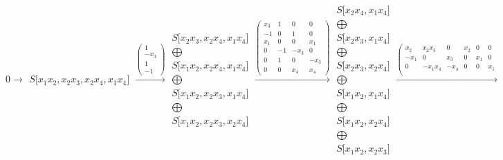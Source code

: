 \documentclass[12pt,a3paper,landscape]{amsart}
\numberwithin{equation}{section}
\theoremstyle{plain}
\theoremstyle{definition}
\begin{document}
$$
0 \rightarrow \begin{matrix}
S \lbrack x_{1}x_{2},x_{2}x_{3},x_{2}x_{4},x_{1}x_{4} \rbrack
\end{matrix}
\xrightarrow{\left( \begin{matrix}
1 \\
-x_{3} \\
1 \\
-1
\end{matrix} \right)}\begin{matrix}
S \lbrack x_{2}x_{3},x_{2}x_{4},x_{1}x_{4} \rbrack \\ \bigoplus \\
S \lbrack x_{1}x_{2},x_{2}x_{4},x_{1}x_{4} \rbrack \\ \bigoplus \\
S \lbrack x_{1}x_{2},x_{2}x_{3},x_{1}x_{4} \rbrack \\ \bigoplus \\
S \lbrack x_{1}x_{2},x_{2}x_{3},x_{2}x_{4} \rbrack
\end{matrix}
\xrightarrow{\left( \begin{matrix}
x_{3} & 1 & 0 & 0 \\
-1 & 0 & 1 & 0 \\
x_{1} & 0 & 0 & x_{1} \\
0 & -1 & -x_{3} & 0 \\
0 & 1 & 0 & -x_{3} \\
0 & 0 & x_{4} & x_{4}
\end{matrix} \right)}\begin{matrix}
S \lbrack x_{2}x_{4},x_{1}x_{4} \rbrack \\ \bigoplus \\
S \lbrack x_{2}x_{3},x_{1}x_{4} \rbrack \\ \bigoplus \\
S \lbrack x_{2}x_{3},x_{2}x_{4} \rbrack \\ \bigoplus \\
S \lbrack x_{1}x_{2},x_{1}x_{4} \rbrack \\ \bigoplus \\
S \lbrack x_{1}x_{2},x_{2}x_{4} \rbrack \\ \bigoplus \\
S \lbrack x_{1}x_{2},x_{2}x_{3} \rbrack
\end{matrix}
\xrightarrow{\left( \begin{matrix}
x_{2} & x_{2}x_{3} & 0 & x_{2} & 0 & 0 \\
-x_{1} & 0 & x_{3} & 0 & x_{1} & 0 \\
0 & -x_{1}x_{4} & -x_{4} & 0 & 0 & x_{1} \\

\end{matrix}}$$
\end{document}
